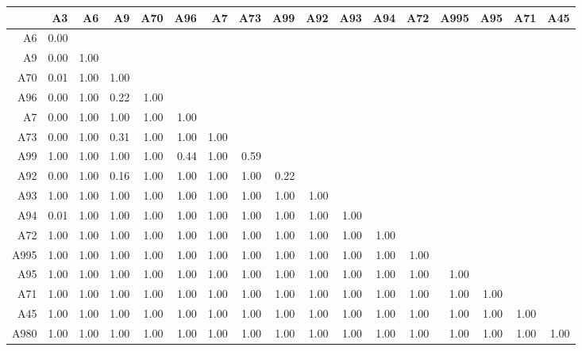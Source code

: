 \documentclass[a4paper,headsepline,footsepline,fontsize=11pt,BCOR=12mm,DIV=12]{report}
\begin{document}
\begin{table}[h]
	\tiny
	\setlength{\tabcolsep}{4pt}
	\centering
	\begin{tabular}{rrrrrrrrrrrrrrrrr}
		\toprule
		& A3 & A6 & A9 & A70 & A96 & A7 & A73 & A99 & A92 & A93 & A94 & A72 & A995 & A95 & A71 & A45 \\ 
		\hline
		A6 & 0.00 &  &  &  &  &  &  &  &  &  &  &  &  &  &  &  \\ 
		A9 & 0.00 & 1.00 &  &  &  &  &  &  &  &  &  &  &  &  &  &  \\ 
		A70 & 0.01 & 1.00 & 1.00 &  &  &  &  &  &  &  &  &  &  &  &  &  \\ 
		A96 & 0.00 & 1.00 & 0.22 & 1.00 &  &  &  &  &  &  &  &  &  &  &  &  \\ 
		A7 & 0.00 & 1.00 & 1.00 & 1.00 & 1.00 &  &  &  &  &  &  &  &  &  &  &  \\ 
		A73 & 0.00 & 1.00 & 0.31 & 1.00 & 1.00 & 1.00 &  &  &  &  &  &  &  &  &  &  \\ 
		A99 & 1.00 & 1.00 & 1.00 & 1.00 & 0.44 & 1.00 & 0.59 &  &  &  &  &  &  &  &  &  \\ 
		A92 & 0.00 & 1.00 & 0.16 & 1.00 & 1.00 & 1.00 & 1.00 & 0.22 &  &  &  &  &  &  &  &  \\ 
		A93 & 1.00 & 1.00 & 1.00 & 1.00 & 1.00 & 1.00 & 1.00 & 1.00 & 1.00 &  &  &  &  &  &  &  \\ 
		A94 & 0.01 & 1.00 & 1.00 & 1.00 & 1.00 & 1.00 & 1.00 & 1.00 & 1.00 & 1.00 &  &  &  &  &  &  \\ 
		A72 & 1.00 & 1.00 & 1.00 & 1.00 & 1.00 & 1.00 & 1.00 & 1.00 & 1.00 & 1.00 & 1.00 &  &  &  &  &  \\ 
		A995 & 1.00 & 1.00 & 1.00 & 1.00 & 1.00 & 1.00 & 1.00 & 1.00 & 1.00 & 1.00 & 1.00 & 1.00 &  &  &  &  \\ 
		A95 & 1.00 & 1.00 & 1.00 & 1.00 & 1.00 & 1.00 & 1.00 & 1.00 & 1.00 & 1.00 & 1.00 & 1.00 & 1.00 &  &  &  \\ 
		A71 & 1.00 & 1.00 & 1.00 & 1.00 & 1.00 & 1.00 & 1.00 & 1.00 & 1.00 & 1.00 & 1.00 & 1.00 & 1.00 & 1.00 &  &  \\ 
		A45 & 1.00 & 1.00 & 1.00 & 1.00 & 1.00 & 1.00 & 1.00 & 1.00 & 1.00 & 1.00 & 1.00 & 1.00 & 1.00 & 1.00 & 1.00 &  \\ 
		A980 & 1.00 & 1.00 & 1.00 & 1.00 & 1.00 & 1.00 & 1.00 & 1.00 & 1.00 & 1.00 & 1.00 & 1.00 & 1.00 & 1.00 & 1.00 & 1.00 \\ 
		  \hline
	\end{tabular}
\end{table}
\end{document}
